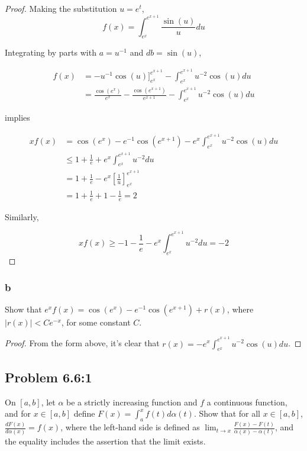 \documentclass{amsart}
\begin{document}
\begin{proof}
Making the substitution $u = e^t$,
\[
f(x) = \int_{e^x}^{e^{x+1}} \frac{\sin(u)}{u}du
\]

Integrating by parts with $a = u^{-1}$ and $db = \sin(u)$,

\begin{align*}
f(x) &= -u^{-1}\cos(u)\Big]_{e^x}^{e^{x+1}} - \int_{e^x}^{e^{x+1}} u^{-2}\cos(u)du \\
&= \frac{\cos(e^x)}{e^x} - \frac{\cos(e^{x+1})}{e^{x+1}} - \int_{e^x}^{e^{x+1}} u^{-2}\cos(u)du
\end{align*}

implies

\begin{align*}
xf(x) &= \cos(e^x) - e^{-1}\cos(e^{x+1}) - e^x\int_{e^x}^{e^{x+1}} u^{-2}\cos(u)du \\
&\leq 1 + \frac{1}{e} + e^x\int_{e^x}^{e^{x+1}} u^{-2}du \\
&= 1 + \frac{1}{e} - e^x\left[\frac{1}{u}\right]_{e^x}^{e^{x+1}} \\
&= 1 + \frac{1}{e} + 1 - \frac{1}{e} = 2
\end{align*}

Similarly,

\[
xf(x) \geq -1 - \frac{1}{e} - e^x\int_{e^x}^{e^{x+1}} u^{-2}du = -2
\]

\end{proof}

\subsubsection*{b}

Show that $e^x f(x) = \cos(e^x) - e^{-1}\cos(e^{x+1}) + r(x)$, where $|r(x)| < Ce^{-x}$, for some constant $C$.

\begin{proof}
From the form above, it's clear that $r(x) = - e^x\int_{e^x}^{e^{x+1}} u^{-2}\cos(u)du$.

\end{proof}

\subsection*{Problem 6.6:1}

On $[a, b]$, let $\alpha$ be a strictly increasing function and $f$ a continuous function, and for $x \in [a, b]$ define $F(x) = \int_a^x f(t) d\alpha(t)$. Show that for all $x \in [a, b]$, $\frac{dF(x)}{d \alpha(x)} = f(x)$, where the left-hand side is defined as $\lim_{t \to x} \frac{F(x) - F(t)}{\alpha(x) - \alpha(t)}$, and the equality includes the assertion that the limit exists.
\end{document}
